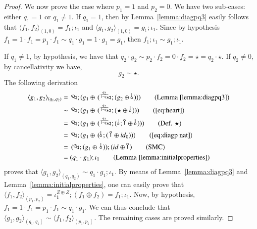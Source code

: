 \begin{proof}
  
We now prove the case where $p_1=1$ and $p_2=0$. We have two sub-cases: either $q_1=1$ or $q_1\neq 1$. 
 If $q_1=1$, then by Lemma~\ref{lemma:diagpq3} easily follows that $\langle f_1,f_2\rangle_{(1,0)}=f_1;\iota_1$ and $\langle g_1,g_2\rangle_{(1,0)}=g_1;\iota_1$. Since by hypothesis 
 $f_1 = 1\cdot f_1= p_1\cdot f_1 \sim q_1\cdot g_1 = 1\cdot g_1 =g_1$, then $f_1;\iota_1 \sim g_1;\iota_1$.

If $q_1\not=1$, by hypothesis, we have that $q_2\cdot g_2\sim p_2\cdot f_2=0 \cdot f_2 = \star = q_2\cdot\star$. If $q_2\not=0$, by cancellativity we have, 
\begin{equation}\tag{$\heartsuit$}\label{eq:heart}
g_2\sim\star \text{.}\end{equation}
The following derivation
    \begin{align}
        \langle g_1,g_2\rangle_{(q_1,q_2)}&= \, \diagpX{q_1}{}; (g_1\piu\, (\diagpX{\frac{q_2}{1-q_1}\,}{};(g_2\piu\, \bangp{})) ) \tag{Lemma~\ref{lemma:diagpq3}}\\
        &\sim \, \diagpX{q_1}{}; (g_1\piu\, (\diagpX{\frac{q_2}{1-q_1}\,}{};(\star \piu\, \bangp{})) ) \tag{\eqref{eq:heart}}\\
        &= \, \diagpX{q_1}{}; (g_1\piu\, (\diagpX{\frac{q_2}{1-q_1}\,}{};(\,\bangp{};\cobang{} \piu\, \bangp{})) ) \tag{Def. $\star$}\\
        &=\, \diagpX{q_1}{}; (g_1\piu\, (\,\bangp{};(\,\cobang{}\piu \id{0}) ))\tag{\ref{eq:diagp nat}}\\
        &= \, (\diagpX{q_1}{}; (g_1\piu\, \,\bangp{})); (\id{} \oplus \cobang{} )\tag{SMC} \\
        &= (q_1\cdot g_1) ; \iota_1 \tag{Lemma~\ref{lemma:initialproperties}}
    \end{align}
proves that $\langle g_1,g_2\rangle_{(q_1,q_2)}\sim q_1\cdot g_1;\iota_1$. By means of Lemma~\ref{lemma:diagpq3} and Lemma~\ref{lemma:initialproperties}, one can easily prove that $\langle f_1,f_2\rangle_{(p_1,p_2)}=\iota_1^{Z\oplus Z};(f_1\oplus f_2) =f_1;\iota_1 $. Now, by hypothesis, $f_1= 1\cdot f_1 = p_1\cdot f_1 \sim q_1\cdot g_1$. We can thus conclude that $\langle g_1,g_2\rangle_{(q_1,q_2)}\sim \langle f_1,f_2\rangle_{(p_1,p_2)}$. The remaining cases are proved similarly.
\end{proof}


